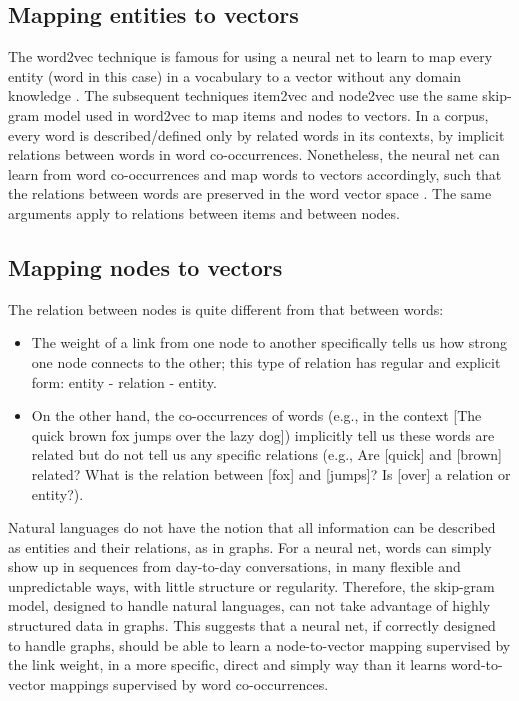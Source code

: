 \documentclass[conference]{IEEEtran}
\begin{document}
\subsection{Mapping entities to vectors}
The word2vec technique is famous for using a neural net to learn to map every 
entity (word in this case) in a vocabulary to a vector without any domain 
knowledge \cite{mikolov2013efficient}.
The subsequent techniques item2vec \cite{barkan2016item2vec}
and node2vec \cite{grovernode2vec} use the same skip-gram 
model used in word2vec to map items and nodes to vectors.
In a corpus, every word is described/defined only by related words in its 
contexts, by implicit relations between words in word co-occurrences.
Nonetheless, the neural net can learn from word co-occurrences and map words to 
vectors accordingly,
such that the relations between words are preserved in the word vector space 
\cite{mikolov2013distributed}.
The same arguments apply to relations between items and between nodes.

\subsection{Mapping nodes to vectors}
The relation between nodes is quite different from that between words:
\begin{itemize}
	\item The weight of a link from one node to another specifically tells us
	how strong one node connects to the other;
	this type of relation has regular and explicit form:
	entity - relation - entity.
	\item On the other hand, the co-occurrences of words 
	(e.g., in the context [The quick brown fox jumps over the lazy dog])
	implicitly tell us these words are related
	but do not tell us any specific relations
	(e.g., Are [quick] and [brown] related? What is the relation between [fox] and [jumps]? Is [over] a relation or entity?).
\end{itemize}
Natural languages do not have the notion that
all information can be described as entities and their relations, as in graphs.
For a neural net, 
words can simply show up in sequences from day-to-day conversations,
in many flexible and unpredictable ways, with little structure or regularity.
Therefore, the skip-gram model, designed to handle natural languages,
can not take advantage of highly structured data in graphs.
This suggests that a neural net, if correctly designed to handle graphs,
should be able to learn a node-to-vector mapping supervised by the link weight,
in a more specific, direct and simply way than it learns word-to-vector 
mappings supervised by word co-occurrences.
\end{document}
